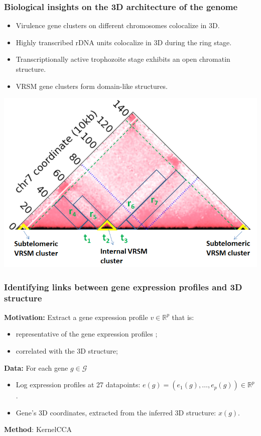 \documentclass[xcolor=dvipsnames]{beamer}
\begin{document}
\begin{frame}
\frametitle{Biological insights on the 3D architecture of the genome}

\begin{itemize}[label={$\bullet$}]

\item Virulence gene clusters on different chromosomes colocalize in 3D.
\item Highly transcribed rDNA units colocalize in 3D during the ring stage.
\item Transcriptionally active trophozoite stage exhibits an open chromatin
structure.
\item VRSM gene clusters form domain-like structures.
\end{itemize}

\begin{center}
\includegraphics[width=0.5\linewidth]{figures/plasmo_TAD.png}
\end{center}
\end{frame}


\begin{frame}
\frametitle{Identifying links between gene expression profiles and 3D structure}
{\color{Blue} \textbf{Motivation:}} Extract a gene expression profile 
$v \in \mathbb{R}^p$ that is:
\begin{itemize}[label={$\bullet$}]

\item representative of the gene expression profiles ;
\item correlated with the 3D structure;
\end{itemize}
\vspace{1em}
{\color{Blue} \textbf{Data:}}
For each gene $g \in \mathcal{G}$
\begin{itemize}[label={$\bullet$}]
\item Log expression profiles at 27 datapoints: $e(g) = \left( e_1(g), \ldots, e_p(g)\right) \in \mathbb{R}^p$ .
\item Gene's 3D coordinates, extracted from the inferred 3D structure: $x(g)$.
\end{itemize}
\vspace{1em}
{\color{Blue} \textbf{Method}:}
 KernelCCA \citep{vert:graph, bach:kernel}

\end{frame}
\end{document}
